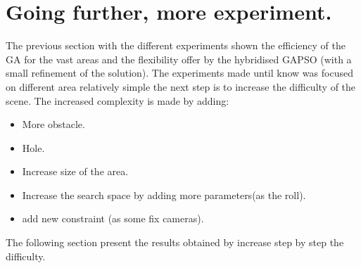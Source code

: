    
		
\section{Going further, more experiment.}

The previous section with the different experiments shown the efficiency of the GA for the vast areas and the flexibility offer by the hybridised GAPSO (with a  small refinement of the solution). The experiments made until know was focused on different area relatively simple the next step is to increase the difficulty of the scene. The increased complexity is made by adding: 
\begin{itemize}
\item More obstacle.
\item Hole.
\item Increase size of the area.
\item Increase the search space by adding more parameters(as the roll). 
\item add new constraint (as  some fix cameras).
\end{itemize} 
The following section present the results obtained by increase step by step the difficulty. 

